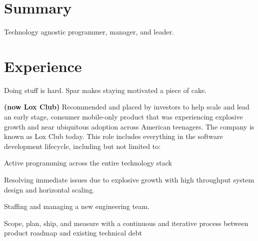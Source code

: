 \documentclass[]{plushcv}
\begin{document}





\begin{minipage}[t]{0.74\textwidth} 

\section{Summary}
Technology agnostic programmer, manager, and leader.

\section{Experience}

\sectionsep
Doing stuff is hard. Spar makes staying motivated a piece of cake.
\sectionsep

 \textbf{(now Lox Club)}
\sectionsep
Recommended and placed by investors to help scale and lead an early stage, consumer mobile-only product that was experiencing explosive growth and near ubiquitous adoption across American teenagers. The company is known as Lox Club today. This role includes everything in the software development lifecycle, including but not limited to: 
\begin{tightemize}
\sectionsep
\sectionsep
\item Active programming across the entire technology stack
\item Resolving immediate issues due to explosive growth with high throughput system design and horizontal scaling.
\item Staffing and managing a new engineering team.
\item Scope, plan, ship, and measure with a continuous and iterative process between product roadmap and existing technical debt
\end{tightemize}
\sectionsep


\end{minipage}
\end{document}
